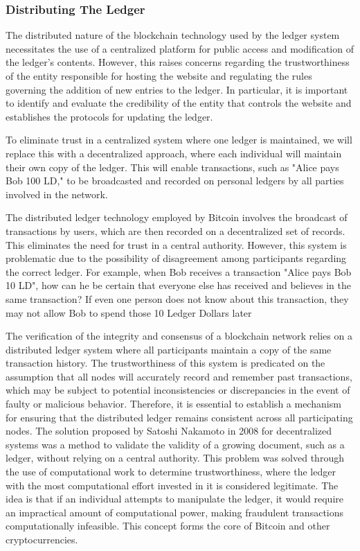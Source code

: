 \subsubsection{Distributing The Ledger}
The distributed nature of the blockchain technology used by the ledger system necessitates the use of a centralized platform for public access
and modification of the ledger's contents. However, this raises concerns regarding the trustworthiness of the entity responsible for hosting
the website and regulating the rules governing the addition of new entries to the ledger. In particular, it is important to identify and
evaluate the credibility of the entity that controls the website and establishes the protocols for updating the ledger.

To eliminate trust in a centralized system where one ledger is maintained, we will replace this with a decentralized approach, where
each individual will maintain their own copy of the ledger. This will enable transactions, such as "Alice pays Bob 100 LD," to be broadcasted
and recorded on personal ledgers by all parties involved in the network.

The distributed ledger technology employed by Bitcoin involves the broadcast of transactions by users, which are then recorded on a
decentralized set of records. This eliminates the need for trust in a central authority. However, this system is problematic due to the
possibility of disagreement among participants regarding the correct ledger. For example, when Bob receives a transaction "Alice pays Bob
10 LD", how can he be certain that everyone else has received and believes in the same transaction? If even one person does not know about
this transaction, they may not allow Bob to spend those 10 Ledger Dollars later

%

The verification of the integrity and consensus of a blockchain network relies on a distributed ledger system where all participants maintain
a copy of the same transaction history. The trustworthiness of this system is predicated on the assumption that all nodes will accurately
record and remember past transactions, which may be subject to potential inconsistencies or discrepancies in the event of faulty or malicious
behavior. Therefore, it is essential to establish a mechanism for ensuring that the distributed ledger remains consistent across all
participating nodes. The solution proposed by Satoshi Nakamoto in 2008 for decentralized systems was a method to validate the validity of
a growing document, such as a ledger, without relying on a central authority. This problem was solved through the use of computational
work to determine trustworthiness, where the ledger with the most computational effort invested in it is considered legitimate. The idea
is that if an individual attempts to manipulate the ledger, it would require an impractical amount of computational power, making fraudulent
transactions computationally infeasible. This concept forms the core of Bitcoin and other cryptocurrencies.
